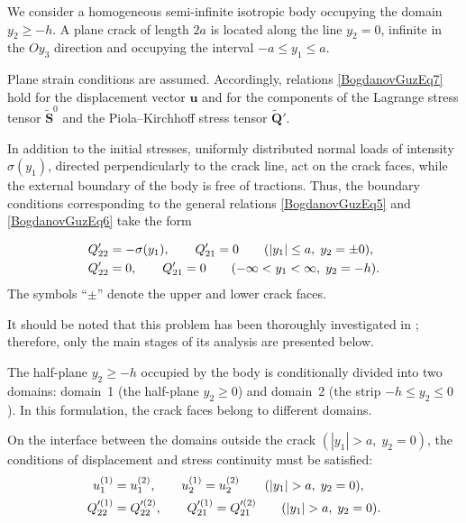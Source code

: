 We consider a homogeneous semi-infinite isotropic body occupying the domain 
$y_{2} \ge -h$. A plane crack of length $2a$ is located along the line 
$y_{2} = 0$, infinite in the $Oy_{3}$ direction and occupying the interval 
$-a \le y_{1} \le a$.

Plane strain conditions are assumed. Accordingly, relations 
\eqref{BogdanovGuzEq7} hold for the displacement vector $\mathbf{u}$ 
and for the components of the Lagrange stress tensor $\tilde{\mathbf S}^{0}$ 
and the Piola--Kirchhoff stress tensor $\tilde{\mathbf Q}'$.

In addition to the initial stresses, uniformly distributed normal loads 
of intensity $\sigma(y_{1})$, directed perpendicularly to the crack line, 
act on the crack faces, while the external boundary of the body is free 
of tractions. Thus, the boundary conditions corresponding to the general 
relations \eqref{BogdanovGuzEq5} and \eqref{BogdanovGuzEq6} take the form

\begin{align}
	\notag
	Q'_{22} &= -\sigma(y_{1}), 
	\qquad 
	Q'_{21} = 0
	\qquad (|y_{1}| \le a,\; y_{2} = \pm 0), 
	\\ \label{BogdanovGuzEq16}
	Q'_{22} &= 0, 
	\qquad 
	Q'_{21} = 0
	\qquad (-\infty < y_{1} < \infty,\; y_{2} = -h).
\end{align}
%
The symbols “$\pm$” denote the upper and lower crack faces.

It should be noted that this problem has been thoroughly investigated in \cite{BogdanovGuz10}; therefore, only the main stages of its analysis are presented below.

The half-plane $y_{2} \ge -h$ occupied by the body is conditionally divided into two domains: domain~1 (the half-plane $y_{2} \ge 0$) and domain~2 (the strip $-h \le y_{2} \le 0$). In this formulation, the crack faces belong to different domains. 

On the interface between the domains outside the crack $(|y_{1}|>a,\; y_{2}=0)$, the conditions of displacement and stress continuity must be satisfied:
\begin{align}
	\notag
	u_{1}^{(1)} &= u_{1}^{(2)}, 
	\qquad 
	u_{2}^{(1)} = u_{2}^{(2)}
	\qquad (|y_{1}| > a,\; y_{2} = 0),\\
	\label{BogdanovGuzEq17}
	Q_{22}^{\prime (1)} &= Q_{22}^{\prime (2)}, 
	\qquad 
	Q_{21}^{\prime (1)} = Q_{21}^{\prime (2)}
	\qquad (|y_{1}| > a,\; y_{2} = 0).
\end{align}

